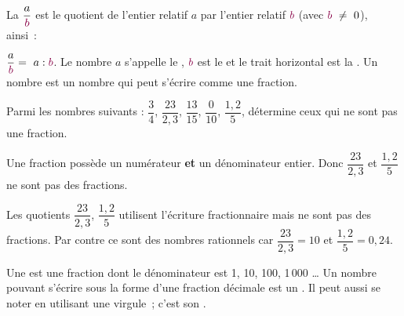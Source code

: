 

\begin{aconnaitre}
La  $\dfrac{a}{\textcolor{C1}{b}}$ est le quotient de l'entier relatif $a$ par l'entier relatif $\textcolor{C1}{b}$ (avec $\textcolor{C1}{b} \neq 0$), ainsi :

$\dfrac{a}{\textcolor{C1}{b}} = a : \textcolor{C1}{b}$. Le nombre $a$ s'appelle le , $\textcolor{C1}{b}$ est le  et le trait horizontal est la . Un nombre  est un nombre qui peut s'écrire comme une fraction.
\end{aconnaitre}


\begin{methode*1}

\begin{exemple*1}
Parmi les nombres suivants : $\dfrac{3}{4}$, $\dfrac{23}{2,3}$, $\dfrac{13}{15}$, $\dfrac{0}{10}$, $\dfrac{1,2}{5}$, détermine ceux qui ne sont pas une fraction.

Une fraction possède un numérateur \textbf{et} un dénominateur entier. Donc $\dfrac{23}{2,3}$ et $\dfrac{1,2}{5}$ ne sont pas des fractions.
 \end{exemple*1}
 
\begin{remarque}
Les quotients $\dfrac{23}{2,3}$, $\dfrac{1,2}{5}$ utilisent l'écriture fractionnaire mais ne sont pas des fractions. Par contre ce sont des nombres rationnels car $\dfrac{23}{2,3} = 10$ et $\dfrac{1,2}{5} = 0,24$.
 \end{remarque}
 
  \exercice  

 \end{methode*1}


\begin{aconnaitre}
Une  est une fraction dont le dénominateur est 1, 10, 100, 1\,000 \ldots
Un nombre pouvant s'écrire sous la forme d'une fraction décimale est un . Il peut aussi se noter en utilisant une virgule ; c'est son .
\end{aconnaitre}

